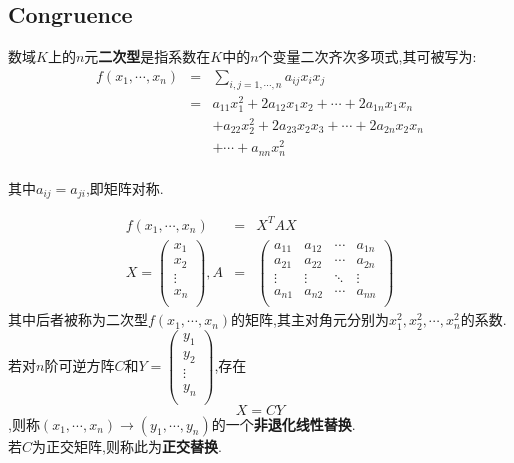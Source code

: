 \documentclass[UTF8,a4paper,notitlepage]{book}
\begin{document}
        \subsection{Congruence}
        \begin{definition}[二次型]
            数域$K$上的$n$元\textbf{二次型}是指系数在$K$中的$n$个变量二次齐次多项式,其可被写为:
            \begin{eqnarray*}
                f(x_1,\cdots,x_n)&=&\sum_{i,j=1,\cdots,n} a_{ij}x_ix_j \\ 
                &=&a_{11}x_1^2+2a_{12}x_1x_2+\cdots+2a_{1n}x_1x_n \\ 
                &&+a_{22}x_2^2+2a_{23}x_2x_3+\cdots+2a_{2n}x_2x_n \\ 
                &&+\cdots+a_{nn}x^2_n \\ 
            \end{eqnarray*}
        \end{definition}
                其中$a_{ij}=a_{ji}$,即矩阵对称.
        \begin{definition}[二次型矩阵]
            \begin{eqnarray*}
                f(x_1,\cdots,x_n)&=&X^TAX \\
                X= \begin{pmatrix}
                x_1\\ x_2\\ \vdots \\ x_n \\ 
            \end{pmatrix},A&=& \begin{pmatrix}
                a_{11}&a_{12}&\cdots&a_{1n}\\ 
                a_{21}&a_{22}&\cdots&a_{2n}\\ 
                \vdots&\vdots&\ddots&\vdots\\ 
                a_{n1}&a_{n2}&\cdots&a_{nn}\\ 
            \end{pmatrix}
        \end{eqnarray*}
            其中后者被称为二次型$f(x_1,\cdots,x_n)$的矩阵,其主对角元分别为$x_1^2,x_2^2,\cdots,x_n^2$的系数.
            若对$n$阶可逆方阵$C$和$Y=\begin{pmatrix}
                y_1\\ y_2\\ \vdots \\ y_n\\ 
            \end{pmatrix}$,存在$$X=CY$$,则称$(x_1,\cdots,x_n)\to (y_1,\cdots,y_n)$的一个\textbf{非退化线性替换}.\\ 
            若$C$为正交矩阵,则称此为\textbf{正交替换}.
        \end{definition}
\end{document}
